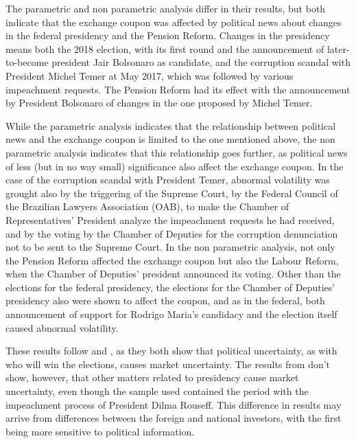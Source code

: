 \documentclass[cic,tc, english]{iiufrgs}
\begin{document}
    The parametric and non parametric analysis differ in their results, but both indicate that the exchange coupon was affected by political news about changes in the federal presidency and the Pension Reform. Changes in the presidency means both the 2018 election, with its first round and the announcement of later-to-become president Jair Bolsonaro as candidate, and the corruption scandal with President Michel Temer at May 2017, which was followed by various impeachment requests. The Pension Reform had its effect with the announcement by President Bolsonaro of changes in the one proposed by Michel Temer.

    While the parametric analysis indicates that the relationship between political news and the exchange coupon is limited to the one mentioned above, the non parametric analysis indicates that this relationship goes further, as political news of less (but in no way small) significance also affect the exchange coupon. In the case of the corruption scandal with President Temer, abnormal volatility was grought also by the triggering of the Supreme Court, by the Federal Council of the Brazilian Lawyers Association (OAB), to make the Chamber of Representatives' President analyze the impeachment requests he had received, and by the voting by the Chamber of Deputies for the corruption denunciation not to be sent to the Supreme Court. In the non parametric analysis, not only the Pension Reform affected the exchange coupon but also the Labour Reform, when the Chamber of Deputies' president announced its voting. Other than the elections for the federal presidency, the elections for the Chamber of Deputies' presidency also were shown to affect the coupon, and as in the federal, both announcement of support for Rodrigo Maria's candidacy and the election itself caused abnormal volatility.

    These results follow \cite{smales2015} and \cite{marquessantos2016}, as they both show that political uncertainty, as with who will win the elections, causes market uncertainty. The results from \cite{marquessantos2016} don't show, however, that other matters related to presidency cause market uncertainty, even though the sample used contained the period with the impeachment process of President Dilma Rouseff. This difference in results may arrive from differences between the foreign and national investors, with the first being more sensitive to political information.
\end{document}
